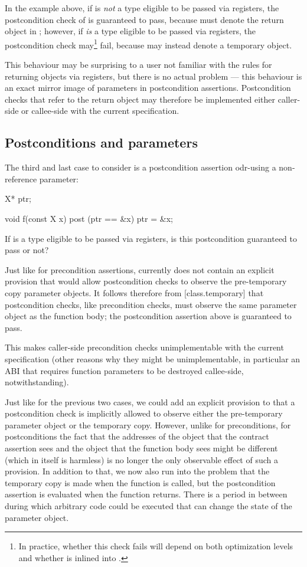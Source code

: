 In the example above, if  is \emph{not} a type eligible to be passed via registers, the postcondition check of  is guaranteed to pass, because  must denote the return object  in ; however, if  \emph{is} a type eligible to be passed via registers, the postcondition check may\footnote{In practice, whether this check fails will depend on both optimization levels and whether  is inlined into .} fail, because  may instead denote a temporary object.

This behaviour may be surprising to a user not familiar with the rules for returning objects via registers, but there is no actual problem --- this behaviour is an exact mirror image of parameters in postcondition assertions. Postcondition checks that refer to the return object may therefore be implemented either caller-side or callee-side with the current specification.

\subsection{Postconditions and parameters}

The third and last case to consider is a postcondition assertion odr-using a non-reference parameter:

\begin{codeblock}
X* ptr;

void f(const X x) post (ptr == &x) {
  ptr = &x;
}
\end{codeblock}

If  is a type eligible to be passed via registers, is this postcondition guaranteed to pass or not?

Just like for precondition assertions, \cite{P2900R10} currently does not contain an explicit provision that would allow postcondition checks to observe the pre-temporary copy parameter objects. It follows therefore from [class.temporary] that postcondition checks, like precondition checks, must observe the same parameter object as the function body; the postcondition assertion above is guaranteed to pass.

This makes caller-side precondition checks unimplementable with the current specification (other reasons why they might be unimplementable, in particular an ABI that requires function parameters to be destroyed callee-side, notwithstanding).

Just like for the previous two cases, we could add an explicit provision to \cite{P2900R10} that a postcondition check is implicitly allowed to observe either the pre-temporary parameter object or the temporary copy. However, unlike for preconditions, for postconditions the fact that the addresses of the object that the contract assertion sees and the object that the function body sees might be different (which in itself is harmless) is no longer the only observable effect of such a provision. In addition to that, we now also run into the problem that the temporary copy is made when the function is called, but the postcondition assertion is evaluated when the function returns. There is a period in between during which arbitrary code could be executed that can change the state of the parameter object.

